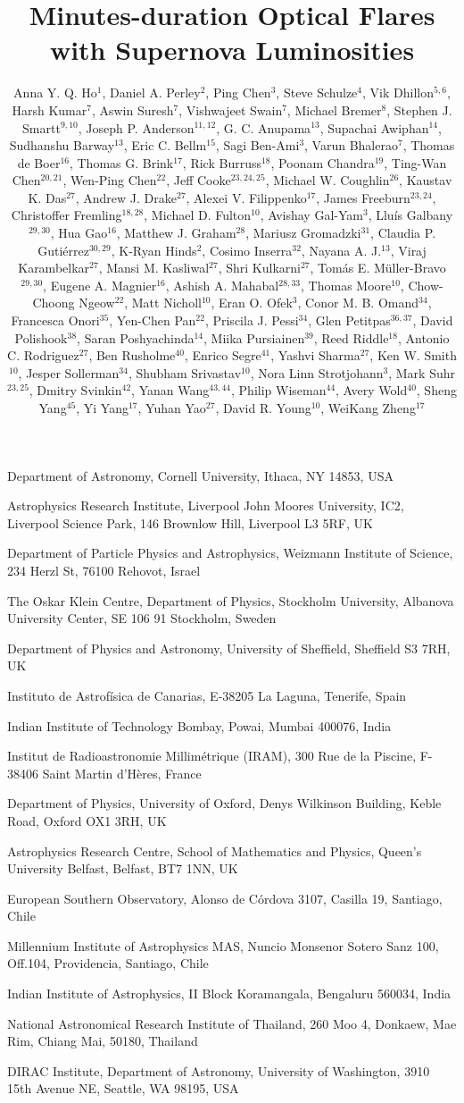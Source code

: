 \documentclass{nature_plusfigure}
\title{Minutes-duration Optical Flares with Supernova Luminosities}
\author{Anna Y. Q. Ho$^{1}$, Daniel A. Perley$^{2}$, Ping Chen$^{3}$, Steve Schulze$^{4}$, Vik Dhillon$^{5,6}$, Harsh Kumar$^{7}$, Aswin Suresh$^{7}$, Vishwajeet Swain$^{7}$, Michael Bremer$^{8}$, Stephen J. Smartt$^{9,10}$, Joseph P. Anderson$^{11,12}$, G. C. Anupama$^{13}$, Supachai Awiphan$^{14}$, Sudhanshu Barway$^{13}$, Eric C. Bellm$^{15}$, Sagi Ben-Ami$^{3}$, Varun Bhalerao$^{7}$, Thomas de Boer$^{16}$, Thomas G. Brink$^{17}$, Rick Burruss$^{18}$, Poonam Chandra$^{19}$, Ting-Wan Chen$^{20,21}$, Wen-Ping Chen$^{22}$, Jeff Cooke$^{23,24,25}$, Michael W. Coughlin$^{26}$, Kaustav K. Das$^{27}$, Andrew J. Drake$^{27}$, Alexei V. Filippenko$^{17}$, James Freeburn$^{23,24}$, Christoffer Fremling$^{18,28}$, Michael D. Fulton$^{10}$, Avishay Gal-Yam$^{3}$, Llu\'is Galbany$^{29,30}$, Hua Gao$^{16}$, Matthew J. Graham$^{28}$, Mariusz Gromadzki$^{31}$, Claudia P. Guti\'errez$^{30,29}$, K-Ryan Hinds$^{2}$, Cosimo Inserra$^{32}$, Nayana A. J.$^{13}$, Viraj Karambelkar$^{27}$, Mansi M. Kasliwal$^{27}$, Shri Kulkarni$^{27}$, Tom\'as E. M\"uller-Bravo$^{29,30}$, Eugene A. Magnier$^{16}$, Ashish A. Mahabal$^{28,33}$, Thomas Moore$^{10}$, Chow-Choong Ngeow$^{22}$, Matt Nicholl$^{10}$, Eran O. Ofek$^{3}$, Conor M. B. Omand$^{34}$, Francesca Onori$^{35}$, Yen-Chen Pan$^{22}$, Priscila J. Pessi$^{34}$, Glen Petitpas$^{36,37}$, David Polishook$^{38}$, Saran Poshyachinda$^{14}$, Miika Pursiainen$^{39}$, Reed Riddle$^{18}$, Antonio C. Rodriguez$^{27}$, Ben Rusholme$^{40}$, Enrico Segre$^{41}$, Yashvi Sharma$^{27}$, Ken W. Smith$^{10}$, Jesper Sollerman$^{34}$, Shubham Srivastav$^{10}$, Nora Linn Strotjohann$^{3}$, Mark Suhr$^{23,25}$, Dmitry Svinkin$^{42}$, Yanan Wang$^{43,44}$, Philip Wiseman$^{44}$, Avery Wold$^{40}$, Sheng Yang$^{45}$, Yi Yang$^{17}$, Yuhan Yao$^{27}$, David R. Young$^{10}$, WeiKang Zheng$^{17}$
	}
\begin{document}
\maketitle

\begin{small}
\begin{affiliations}
\label{sec:affiliations}

\item Department of Astronomy, Cornell University, Ithaca, NY 14853, USA
\item Astrophysics Research Institute, Liverpool John Moores University, IC2, Liverpool Science Park, 146 Brownlow Hill, Liverpool L3 5RF, UK
\item Department of Particle Physics and Astrophysics, Weizmann Institute of Science, 234 Herzl St, 76100 Rehovot, Israel
\item The Oskar Klein Centre, Department of Physics, Stockholm University, Albanova University Center, SE 106 91 Stockholm, Sweden
\item Department of Physics and Astronomy, University of Sheffield, Sheffield S3 7RH, UK
\item Instituto de Astrofísica de Canarias, E-38205 La
Laguna, Tenerife, Spain
\item Indian Institute of Technology Bombay, Powai, Mumbai 400076, India
\item Institut de Radioastronomie Millimétrique (IRAM), 300 Rue de la Piscine, F-38406 Saint Martin d’Hères, France
\item Department of Physics, University of Oxford, Denys Wilkinson Building, Keble Road, Oxford OX1 3RH, UK
\item Astrophysics Research Centre, School of Mathematics and Physics, Queen’s University Belfast, Belfast, BT7 1NN, UK
\item European Southern Observatory, Alonso de C\'ordova 3107, Casilla 19, Santiago, Chile
\item Millennium Institute of Astrophysics MAS, Nuncio Monsenor Sotero Sanz 100, Off.104, Providencia, Santiago, Chile
\item Indian Institute of Astrophysics, II Block Koramangala, Bengaluru 560034, India
\item National Astronomical Research Institute of Thailand, 260 Moo 4, Donkaew, Mae Rim, Chiang Mai, 50180, Thailand
\item DIRAC Institute, Department of Astronomy, University of Washington, 3910 15th Avenue NE, Seattle, WA 98195, USA

\end{affiliations}
\end{small}
\end{document}
